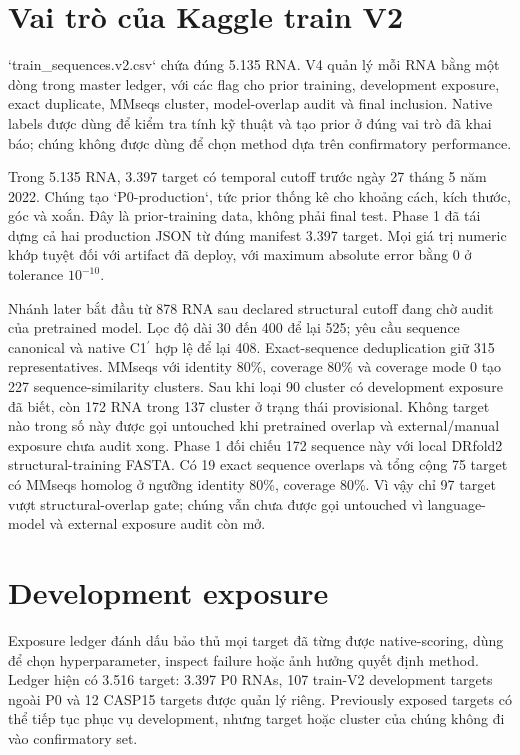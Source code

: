 \documentclass[12pt,a4paper,oneside]{report}
\newcommand{\cprime}{C1$^{\prime}$}
\begin{document}
\section{Vai trò của Kaggle train V2}

`train_sequences.v2.csv` chứa đúng 5.135 RNA. V4 quản lý mỗi RNA bằng một dòng trong
master ledger, với các flag cho prior training, development exposure, exact duplicate,
MMseqs cluster, model-overlap audit và final inclusion. Native labels được dùng để kiểm
tra tính kỹ thuật và tạo prior ở đúng vai trò đã khai báo; chúng không được dùng để
chọn method dựa trên confirmatory performance.

Trong 5.135 RNA, 3.397 target có temporal cutoff trước ngày 27 tháng 5 năm 2022. Chúng
tạo `P0-production`, tức prior thống kê cho khoảng cách, kích thước, góc và xoắn. Đây là
prior-training data, không phải final test. Phase 1 đã tái dựng cả hai production JSON
từ đúng manifest 3.397 target. Mọi giá trị numeric khớp tuyệt đối với artifact đã deploy,
với maximum absolute error bằng 0 ở tolerance $10^{-10}$.

Nhánh later bắt đầu từ 878 RNA sau declared structural cutoff đang chờ audit của
pretrained model. Lọc độ dài 30 đến 400 để lại 525; yêu cầu sequence canonical và native
\cprime{} hợp lệ để lại 408. Exact-sequence deduplication giữ 315 representatives.
MMseqs với identity 80\%, coverage 80\% và coverage mode 0 tạo 227
sequence-similarity clusters. Sau khi loại 90 cluster có development exposure đã biết,
còn 172 RNA trong 137 cluster ở trạng thái provisional. Không target nào trong số này
được gọi untouched khi pretrained overlap và external/manual exposure chưa audit xong.
Phase 1 đối chiếu 172 sequence này với local DRfold2 structural-training FASTA. Có 19
exact sequence overlaps và tổng cộng 75 target có MMseqs homolog ở ngưỡng identity
80\%, coverage 80\%. Vì vậy chỉ 97 target vượt structural-overlap gate; chúng vẫn chưa
được gọi untouched vì language-model và external exposure audit còn mở.

\section{Development exposure}

Exposure ledger đánh dấu bảo thủ mọi target đã từng được native-scoring, dùng để chọn
hyperparameter, inspect failure hoặc ảnh hưởng quyết định method. Ledger hiện có 3.516
target: 3.397 P0 RNAs, 107 train-V2 development targets ngoài P0 và 12 CASP15 targets
được quản lý riêng. Previously exposed targets có thể tiếp tục phục vụ development,
nhưng target hoặc cluster của chúng không đi vào confirmatory set.
\end{document}
